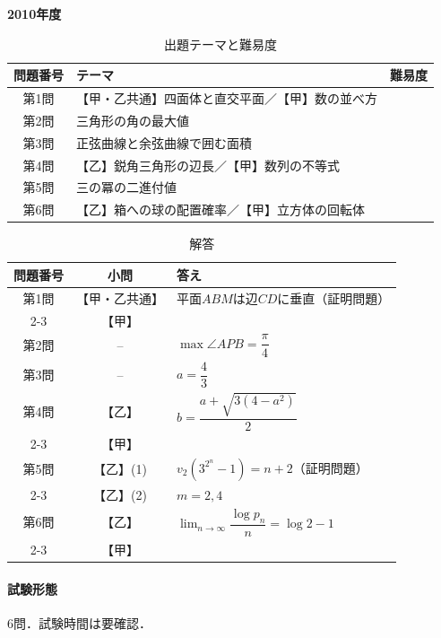 \documentclass[../../main.tex]{subfiles}
\begin{document}
\begin{center}
  {\fontsize{48pt}{58pt}\selectfont \textbf{2010}\normalsize\textbf{年度}}
\end{center}

\begin{table}[htb]
  \centering
  \caption{出題テーマと難易度}
  \begin{tabular}{|c|p{9cm}|c|}
    \hline
    \textbf{問題番号} & \textbf{テーマ} & \textbf{難易度} \\
    \hline
    第1問 & 【甲・乙共通】四面体と直交平面／【甲】数の並べ方 & \\
    \hline
    第2問 & 三角形の角の最大値 & \\
    \hline
    第3問 & 正弦曲線と余弦曲線で囲む面積 & \\
    \hline
    第4問 & 【乙】鋭角三角形の辺長／【甲】数列の不等式 & \\
    \hline
    第5問 & 三の冪の二進付値 & \\
    \hline
    第6問 & 【乙】箱への球の配置確率／【甲】立方体の回転体 & \\
    \hline
  \end{tabular}
\end{table}

\begin{table}[htb]
  \centering
  \caption{解答}
  \renewcommand{\arraystretch}{1.4}
  \begin{tabular}{|c|c|p{9cm}|}
    \hline
    \textbf{問題番号} & \textbf{小問} & \textbf{答え} \\
    \hline
    第1問 & 【甲・乙共通】 & 平面$ABM$は辺$CD$に垂直（証明問題） \\
    \cline{2-3}
    & 【甲】 &  \\
    \hline
    第2問 & -- & $\max\angle APB=\dfrac{\pi}{4}$ \\
    \hline
    第3問 & -- & $a=\dfrac{4}{3}$ \\
    \hline
    第4問 & 【乙】 & $b=\dfrac{a+\sqrt{3(4-a^2)}}{2}$ \\
    \cline{2-3}
    & 【甲】 &  \\
    \hline
    第5問 & 【乙】(1) & $v_2(3^{2^n}-1)=n+2$（証明問題） \\
    \cline{2-3}
    & 【乙】(2) & $m=2,4$ \\
    \hline
    第6問 & 【乙】 & $\lim_{n\to\infty}\dfrac{\log p_n}{n}=\log2-1$ \\
    \cline{2-3}
    & 【甲】 &  \\
    \hline
  \end{tabular}
\end{table}

\paragraph{試験形態}
6問．試験時間は要確認．
\end{document}
